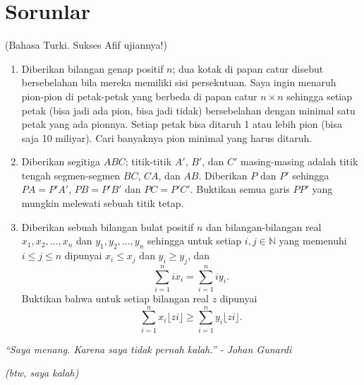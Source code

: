 \documentclass{article}
\begin{document}
	\section{Sorunlar}
	(Bahasa Turki. Sukses Afif ujiannya!)
	\vspace{1em}
	\begin{enumerate}
		\item Diberikan bilangan genap positif $n$; dua kotak di papan catur disebut bersebelahan bila mereka memiliki sisi persekutuan. Saya ingin menaruh pion-pion di petak-petak yang berbeda di papan catur $n \times n$ sehingga setiap petak (bisa jadi ada pion, bisa jadi tidak) bersebelahan dengan minimal satu petak yang ada pionnya. Setiap petak bisa ditaruh 1 atau lebih pion (bisa saja 10 miliyar). Cari banyaknya pion minimal yang harus ditaruh.
		\item Diberikan segitiga $ABC$; titik-titik $A'$, $B'$, dan $C'$ masing-masing adalah titik tengah segmen-segmen $BC$, $CA$, dan $AB$. Diberikan $P$ dan $P'$ sehingga $PA = P'A'$, $PB = P'B'$ dan $PC = P'C'$. Buktikan semua garis $PP'$ yang mungkin melewati sebuah titik tetap.
		\item Diberikan sebuah bilangan bulat positif $n$ dan bilangan-bilangan real $x_1, x_2, \dotsc, x_n$ dan $y_1, y_2, \dotsc, y_n$ sehingga untuk setiap $i, j \in \mathbb{N}$ yang memenuhi $i \le j \le n$ dipunyai $x_i \le x_j$ dan $y_i \ge y_j$, dan
			\[ \sum_{i=1}^n ix_i = \sum_{i=1}^n iy_i. \]
		Buktikan bahwa untuk setiap bilangan real $z$ dipunyai \[ \sum_{i=1}^n x_i \lfloor zi \rfloor \ge \sum_{i=1}^n y_i \lfloor zi \rfloor. \]
	\end{enumerate}
	\begin{center}
		\textit{``Saya menang. Karena saya tidak pernah kalah.'' - Johan Gunardi}
		
		\vspace{1em}
		
		\textit{(btw, saya kalah)}
	\end{center}
\end{document}
